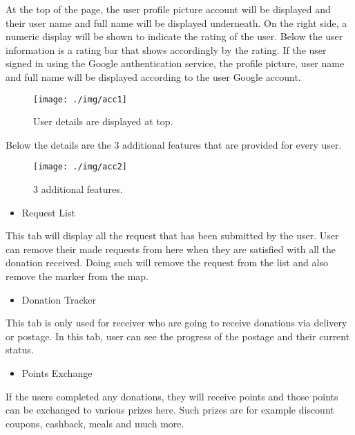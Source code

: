 \documentclass[conference]{IEEEtran}
\begin{document}
At the top of the page, the user profile picture account will be displayed and their user name and full name will be displayed underneath. On the right side, a numeric display will be shown to indicate the rating of the user. Below the user information is a rating bar that shows accordingly by the rating. If the user signed in using the Google authentication service, the profile picture, user name and full name will be displayed according to the user Google account.\\

\begin{figure}[h!]
\texttt{[image: ./img/acc1]}
\centering
\caption{User details are displayed at top.}
\end{figure}

Below the details are the 3 additional features that are provided for every user. \\
\begin{figure}[h!]
\texttt{[image: ./img/acc2]}
\centering
\caption{3 additional features.}
\end{figure}
\begin{itemize}
\item Request List
\end{itemize}
This tab will display all the request that has been submitted by the user. User can remove their made requests from here when they are satisfied with all the donation received. Doing such will remove the request from the list and also remove the marker from the map.
\begin{itemize}
\item Donation Tracker
\end{itemize}
This tab is only used for receiver who are going to receive donations via delivery or postage. In this tab, user can see the progress of the postage and their current status.
\begin{itemize}
\item Points Exchange
\end{itemize}
If the users completed any donations, they will receive points and those points can be exchanged to various prizes here. Such prizes are for example discount coupons, cashback, meals and much more.\\
\end{document}
